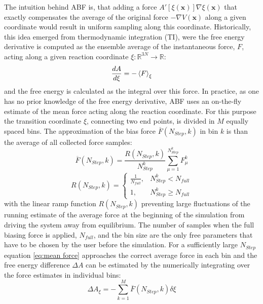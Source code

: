 The intuition behind ABF is, that adding a force $A'[\xi(\textbf{x})]\nabla\xi(\textbf{x})$ that exactly compensates the average of the original force $-\nabla V(\textbf{x})$ along a given coordinate would result in uniform sampling along this coordinate.\autocite{comer2015adaptive}
Historically, this idea emerged from thermodynamic integration (TI), were the free energy derivative  is computed as the ensemble average of the instantaneous force, $F$, acting along a given reaction coordinate $\xi: \mathbb{R} ^{3N} \to \mathbb{R}$:
\begin{equation}
\frac{dA}{d\xi} = -\braket{F}_{\xi}
\end{equation}
and the free energy is calculated as the integral over this force.\autocite{kirkwood1935statistical,zwanzig1954high}
In practice, as one has no prior knowledge of the free energy derivative, ABF uses an on-the-fly estimate of the mean force acting along the reaction coordinate. For this purpose the transition coordinate $\xi$, connecting two end points, is divided in $M$ equally spaced bins. The approximation of the bias force $\overline{F}(N_{Step},k)$ in bin $k$ is than the average of all collected force samples:\autocite{comer2015adaptive}
\begin{equation}
  \overline{F}(N_{Step},k) = \frac{R(N_{Step},k)}{N_{Step}^{k}} \sum_{\mu=1}^{N_{Step}^{k}} F_{\mu}^{k}
  \label{eq:mean force}
\end{equation}
\begin{equation}
  R(N_{Step},k)=\left\{\begin{array}{ll} \frac{1}{N_{full}}, & N_{Step}^{k} < N_{full} \\
                                         1,          & N_{Step}^{k} \geq  N_{full} \end{array}\right. \label{eq:ramp}
\end{equation}
with the linear ramp function $R(N_{Step},k)$ preventing large fluctuations of the running estimate of the average force at the beginning of the simulation from driving the system away from equilibrium. The number of samples when the full biasing force is applied, $N_{full}$, and the bin size are the only free parameters that have to be chosen by the user before the simulation. For a sufficiently large $N_{Step}$ equation \ref{eq:mean force} approaches the correct average force in each bin and the free energy difference $\Delta A$ can be estimated by the numerically integrating over the force estimates in individual bins:\autocite{comer2015adaptive}
\begin{equation}
  \Delta A_{\xi} = - \sum_{k=1}^{M} \overline{F}(N_{Step},k) \delta \xi
\end{equation}

